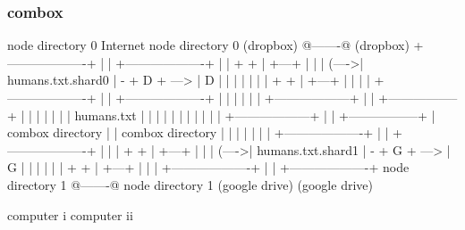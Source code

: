 \begin{frame}[fragile]
  \frametitle{combox}

  {\tiny
  \begin{semiverbatim}

         node directory 0                Internet              node directory 0
         (dropbox)                       @-------@             (dropbox)
        +-------------------+            |       |            +-------------------+
        |                   |    + +     | +---+ |            |                   |
  (---->| humans.txt.shard0 | - + D + ---> | D | |            |                   |
  |     |                   |    + +     | +---+ |            |                   |
  |     +-------------------+            |       |            +-------------------+
  |                                      |       |
  |                                      |       |
 +------------------+                    |       |                        +-----------------+
 |                  |                    |       |                        |                 |
 |  humans.txt      |                    |       |                        |                 |
 |                  |                    |       |                        |                 |
 +------------------+                    |       |                        +-----------------+
  |  combox directory                    |       |                      combox directory
  |                                      |       |
  |                                      |       |
  |     +-------------------+            |       |             +-------------------+
  |     |                   |    + +     | +---+ |             |                   |
  (---->| humans.txt.shard1 | - + G + ---> | G | |             |                   |
        |                   |    + +     | +---+ |             |                   |
        +-------------------+            |       |             +-------------------+
         node directory 1                @-------@              node directory 1
         (google drive)                                         (google drive)

  computer i                                                                    computer ii
  \end{semiverbatim}
  }

\end{frame}


